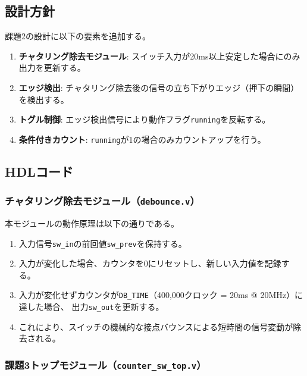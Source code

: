 \documentclass[a4paper,11pt]{ltjsarticle}
\begin{document}
\subsection{設計方針}

課題2の設計に以下の要素を追加する。

\begin{enumerate}
\item \textbf{チャタリング除去モジュール}: スイッチ入力が20ms以上安定した場合にのみ出力を更新する。
\item \textbf{エッジ検出}: チャタリング除去後の信号の立ち下がりエッジ（押下の瞬間）を検出する。
\item \textbf{トグル制御}: エッジ検出信号により動作フラグ\texttt{running}を反転する。
\item \textbf{条件付きカウント}: \texttt{running}が1の場合のみカウントアップを行う。
\end{enumerate}

\subsection{HDLコード}

\subsubsection{チャタリング除去モジュール（\texttt{debounce.v}）}



本モジュールの動作原理は以下の通りである。
\begin{enumerate}
\item 入力信号\texttt{sw\_in}の前回値\texttt{sw\_prev}を保持する。
\item 入力が変化した場合、カウンタを0にリセットし、新しい入力値を記録する。
\item 入力が変化せずカウンタが\texttt{DB\_TIME}（400,000クロック = 20ms @ 20MHz）に達した場合、
  出力\texttt{sw\_out}を更新する。
\item これにより、スイッチの機械的な接点バウンスによる短時間の信号変動が除去される。
\end{enumerate}

\subsubsection{課題3トップモジュール（\texttt{counter\_sw\_top.v}）}
\end{document}
